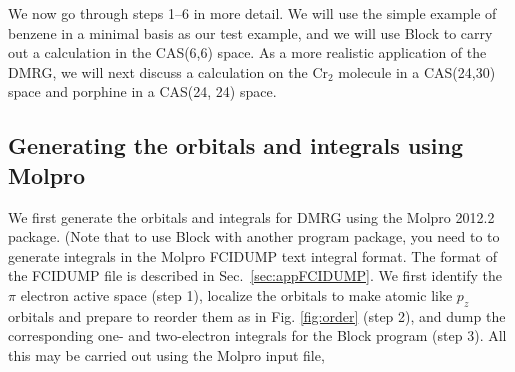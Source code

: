 \documentclass[letterpaper,12pt,aps, pra]{revtex4-1}
\begin{document}
We now go through steps 1--6 in more detail. We will use the simple example of benzene in a minimal basis as our test example, and we will use Block
to carry out a calculation in the CAS(6,6) space. As a more realistic application of the DMRG, we will next discuss a calculation on the Cr$_2$ molecule
in a CAS(24,30) space and porphine in a CAS(24, 24) space.


\subsection{Generating the orbitals and integrals using Molpro}
We first generate the orbitals and integrals for DMRG using the Molpro 2012.2 package. 
(Note that to use Block with another program package, you need to
to generate integrals in the Molpro FCIDUMP text integral format. The format of the FCIDUMP file is described in Sec.~\ref{sec:appFCIDUMP}. 
We first identify
the $\pi$ electron active space (step 1), localize the orbitals to make atomic like $p_z$ orbitals and prepare to reorder them as in Fig. \ref{fig:order} (step 2),
and dump the corresponding one- and two-electron integrals for the Block program (step 3). All this may be carried out using the Molpro input file,
\end{document}
